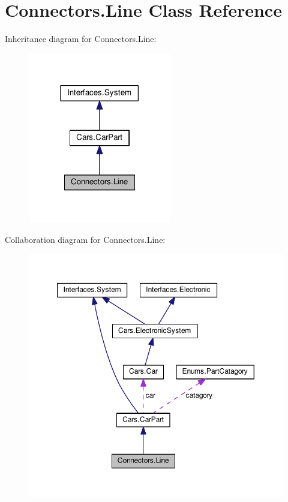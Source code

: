 \hypertarget{classConnectors_1_1Line}{}\section{Connectors.\+Line Class Reference}
\label{classConnectors_1_1Line}


Inheritance diagram for Connectors.\+Line\+:\nopagebreak
\begin{figure}[H]
\begin{center}
\leavevmode
\includegraphics[width=177pt]{classConnectors_1_1Line__inherit__graph}
\end{center}
\end{figure}


Collaboration diagram for Connectors.\+Line\+:\nopagebreak
\begin{figure}[H]
\begin{center}
\leavevmode
\includegraphics[width=350pt]{classConnectors_1_1Line__coll__graph}
\end{center}
\end{figure}
